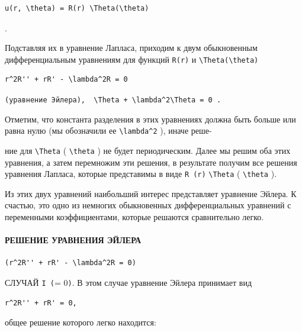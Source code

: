 \documentclass[
  ukrainian,
]{article}
\begin{document}
\begin{verbatim}
u(r, \theta) = R(r) \Theta(\theta)
\end{verbatim}

.

Подставляя их в уравнение Лапласа, приходим к двум обыкновенным
дифференциальным уравнениям для функций \texttt{R(r)} и
\texttt{\textbackslash{}Theta(\textbackslash{}theta)}

\begin{verbatim}
r^2R'' + rR' - \lambda^2R = 0
\end{verbatim}

\texttt{(уравнение\ Эйлера),\ \ \textquotesingle{}\textbackslash{}Theta\textquotesingle{}\textquotesingle{}\ +\ \textbackslash{}lambda\^{}2\textbackslash{}Theta\ =\ 0\textquotesingle{}\ .}

Отметим, что константа разделения в этих уравнениях должна быть больше
или равна нулю (мы обозначили ее \texttt{\textbackslash{}lambda\^{}2} ),
иначе реше-

ние для \texttt{\textbackslash{}Theta} ( \texttt{\textbackslash{}theta}
) не будет периодическим. Далее мы решим оба этих уравнения, а затем
перемножим эти решения, в результате получим все решения уравнения
Лапласа, которые представимы в виде \texttt{R\ (r)}
\texttt{\textbackslash{}Theta} ( \texttt{\textbackslash{}theta} ).

Из этих двух уравнений наибольший интерес представляет уравнение Эйлера.
К счастью, это одно из немногих обыкновенных дифференциальных уравнений
с переменными коэффициентами, которые решаются сравнительно легко.

\paragraph{РЕШЕНИЕ УРАВНЕНИЯ
ЭЙЛЕРА}\label{ux440ux435ux448ux435ux43dux438ux435-ux443ux440ux430ux432ux43dux435ux43dux438ux44f-ux44dux439ux43bux435ux440ux430}

\begin{verbatim}
(r^2R'' + rR' - \lambda^2R = 0)
\end{verbatim}

СЛУЧАЙ \texttt{I\ (}\lambda = 0\texttt{)}. В этом случае уравнение
Эйлера принимает вид

\begin{verbatim}
r^2R'' + rR' = 0,
\end{verbatim}

общее решение которого легко находится:
\end{document}
